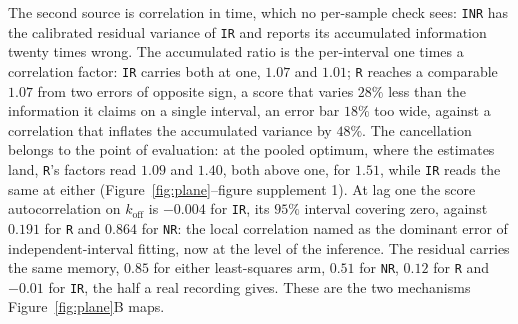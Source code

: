 The second source is correlation in time, which no per-sample check sees: \texttt{INR} has the
calibrated residual variance of \texttt{IR} and reports its accumulated information twenty times
wrong. The accumulated ratio is the per-interval one times a correlation factor: \texttt{IR} carries
both at one, $1.07$ and $1.01$; \texttt{R} reaches a comparable $1.07$ from two errors of opposite
sign, a score that varies $28\%$ less than the information it claims on a single interval, an error
bar $18\%$ too wide, against a correlation that inflates the accumulated variance by $48\%$. The
cancellation belongs to the point of evaluation: at the pooled optimum, where the estimates land,
\texttt{R}'s factors read $1.09$ and $1.40$, both above one, for $1.51$, while \texttt{IR} reads the
same at either (Figure~\ref{fig:plane}--figure supplement 1). At lag one the score autocorrelation
on $k_{\mathrm{off}}$ is $-0.004$ for \texttt{IR}, its $95\%$ interval covering zero, against
$0.191$ for \texttt{R} and $0.864$ for \texttt{NR}: the local correlation \citet{milescu2005maximum}
named as the dominant error of independent-interval fitting, now at the level of the inference. The
residual carries the same memory, $0.85$ for either least-squares arm, $0.51$ for \texttt{NR},
$0.12$ for \texttt{R} and $-0.01$ for \texttt{IR}, the half a real recording gives. These are the
two mechanisms Figure~\ref{fig:plane}B maps.
